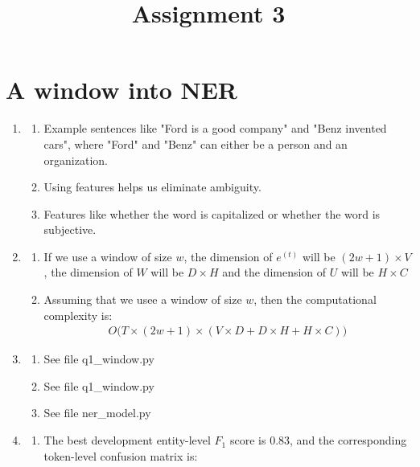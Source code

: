 \documentclass[10pt, a4paper]{ctexart}
\begin{document}
\title{Assignment 3}
\date{}
\author{}
\maketitle

\section{A window into NER}
\begin{enumerate}
    \item {
        \begin{enumerate}
            \item Example sentences like "Ford is a good company" and "Benz invented cars", where "Ford" and "Benz" can either be a person and an organization.
            \item Using features helps us eliminate ambiguity.
            \item Features like whether the word is capitalized or whether the word is subjective.
        \end{enumerate}
    }
    \item {
        \begin{enumerate}
            \item If we use a window of size $w$, the dimension of $e^{(t)}$ will be $(2w+1)\times V$, the dimension of $W$ will be $D\times H$ and the dimension of $U$ will be $H\times C$
            \item Assuming that we usee a window of size $w$, then the computational complexity is: {
                \begin{align*}
                    O\big(T\times(2w+1)\times(V\times D+D\times H+H\times C)\big)
                \end{align*}}
        \end{enumerate}
    }
    \item {
        \begin{enumerate}
            \item See file q1\_window.py
            \item See file q1\_window.py
            \item See file ner\_model.py
        \end{enumerate}
    }
    \item {
        \begin{enumerate}
            \item The best development entity-level $F_1$ score is $0.83$, and the corresponding token-level confusion matrix is: {
}
\end{enumerate}}
\end{enumerate}
\end{document}
